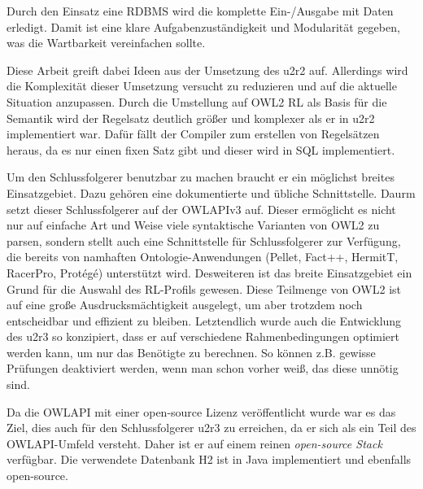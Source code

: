Durch den Einsatz eine RDBMS wird die komplette Ein-/Ausgabe mit Daten erledigt. Damit ist eine klare Aufgabenzuständigkeit und Modularität gegeben, was die Wartbarkeit vereinfachen sollte. 

Diese Arbeit greift dabei Ideen aus der Umsetzung des u2r2 \cite{Weithoehner2008} auf. Allerdings wird die Komplexität dieser Umsetzung versucht zu reduzieren und auf die aktuelle Situation anzupassen. Durch die Umstellung auf OWL2 RL als Basis für die Semantik wird der Regelsatz deutlich größer und komplexer als er in u2r2 implementiert war. Dafür fällt der Compiler zum erstellen von Regelsätzen heraus, da es nur einen fixen Satz gibt und dieser wird in SQL implementiert.

Um den Schlussfolgerer benutzbar zu machen braucht er ein möglichst breites Einsatzgebiet. Dazu gehören eine dokumentierte und übliche Schnittstelle. Daurm setzt dieser Schlussfolgerer auf der OWLAPIv3 \cite{OWLAPI} auf. Dieser ermöglicht es nicht nur auf einfache Art und Weise viele syntaktische Varianten von OWL2 zu parsen, sondern stellt auch eine Schnittstelle für Schlussfolgerer zur Verfügung, die bereits von namhaften Ontologie-Anwendungen (Pellet, Fact++, HermitT, RacerPro, Protégé) unterstützt wird. Desweiteren ist das breite Einsatzgebiet ein Grund für die Auswahl des RL-Profils gewesen. Diese Teilmenge von OWL2 ist auf eine große Ausdrucksmächtigkeit ausgelegt, um aber trotzdem noch entscheidbar und effizient zu bleiben. Letztendlich wurde auch die Entwicklung des u2r3 so konzipiert, dass er auf verschiedene Rahmenbedingungen optimiert werden kann, um nur das Benötigte zu berechnen. So können z.B. gewisse Prüfungen deaktiviert werden, wenn man schon vorher weiß, das diese unnötig sind.

Da die OWLAPI mit einer open-source Lizenz veröffentlicht wurde war es das Ziel, dies auch für den Schlussfolgerer u2r3 zu erreichen, da er sich als ein Teil des OWLAPI-Umfeld versteht. Daher ist er auf einem reinen \emph{open-source Stack} verfügbar. Die verwendete Datenbank H2 ist in Java implementiert und ebenfalls open-source.
